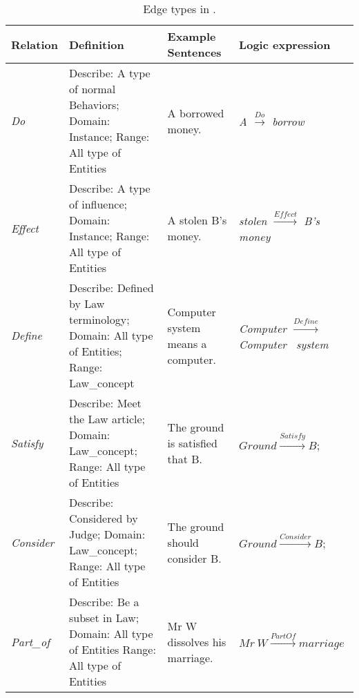 \begin{table}
    \centering
    \tiny
    \caption{Edge types in \lawgraph{}.}
    \label{tab:edge-example}
    \begin{tabular}{p{}|p{}|p{}|p{}}
    \hline
    \hline
        Relation & Definition & Example Sentences &Logic expression\\ 
        \hline
        \textit{Do} & Describe: A type of normal Behaviors; Domain: Instance; Range: All type of Entities & A borrowed money. & \textit{A ${\stackrel{Do}{\longrightarrow}}$ borrow}\\
        \hline
        \textit{Effect} & Describe: A type of influence; Domain: Instance; Range: All type of Entities & A stolen B's money.& \textit{stolen ${\stackrel{Effect}{\longrightarrow}}$ B's money}\\
        \hline
        \textit{Define} & Describe: Defined by Law terminology; Domain: All type of Entities; Range: Law\_concept & Computer system means a computer. & \textit{Computer ${\stackrel{Define}{\longrightarrow}}$ Computer \ system}\\
        \hline
        \textit{Satisfy} & Describe: Meet the Law article; Domain: Law\_concept; Range: All type of Entities & The ground is satisfied that B.  & $ Ground \stackrel{Satisfy}{\longrightarrow} B;$\\
        \hline
        \textit{Consider} &
        Describe: Considered by Judge; Domain: Law\_concept; Range: All type of Entities & The ground should consider B. & $ Ground \stackrel{Consider}{\longrightarrow} B;$\\
        \hline
        \textit{Part\_of} &
        Describe: Be a subset in Law; Domain: All type of Entities Range: All type of Entities & 
        Mr W dissolves his marriage.  & $ Mr \ W \stackrel{PartOf}{\longrightarrow} marriage$\\
        \hline
        \hline
    \end{tabular}
\end{table}